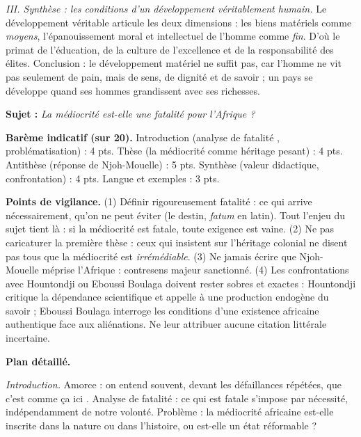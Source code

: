\documentclass[11pt]{article}
\begin{document}
\begin{corrige}
\emph{III. Synthèse : les conditions d'un développement véritablement humain.} Le développement véritable articule les deux dimensions : les biens matériels comme \emph{moyens}, l'épanouissement moral et intellectuel de l'homme comme \emph{fin}. D'où le primat de l'éducation, de la culture de l'excellence et de la responsabilité des élites. Conclusion : le développement matériel ne suffit pas, car l'homme ne vit pas seulement de pain, mais de sens, de dignité et de savoir ; un pays se développe quand ses hommes grandissent avec ses richesses.
\end{corrige}

\begin{corrige}

\textbf{Sujet :} \emph{La médiocrité est-elle une fatalité pour l'Afrique ?}

\tcblower

\textbf{Barème indicatif (sur 20).} Introduction (analyse de \guillemotleft fatalité \guillemotright, problématisation) : 4 pts. Thèse (la médiocrité comme héritage pesant) : 4 pts. Antithèse (réponse de Njoh-Mouelle) : 5 pts. Synthèse (valeur didactique, confrontation) : 4 pts. Langue et exemples : 3 pts.

\textbf{Points de vigilance.} (1) Définir rigoureusement \guillemotleft fatalité \guillemotright : ce qui arrive nécessairement, qu'on ne peut éviter (le destin, \emph{fatum} en latin). Tout l'enjeu du sujet tient là : si la médiocrité est fatale, toute exigence est vaine. (2) Ne pas caricaturer la première thèse : ceux qui insistent sur l'héritage colonial ne disent pas tous que la médiocrité est \emph{irrémédiable}. (3) Ne jamais écrire que Njoh-Mouelle \guillemotleft méprise l'Afrique \guillemotright : contresens majeur sanctionné. (4) Les confrontations avec Hountondji ou Eboussi Boulaga doivent rester sobres et exactes : Hountondji critique la dépendance scientifique et appelle à une production endogène du savoir ; Eboussi Boulaga interroge les conditions d'une existence africaine authentique face aux aliénations. Ne leur attribuer aucune citation littérale incertaine.

\textbf{Plan détaillé.}

\emph{Introduction.} Amorce : on entend souvent, devant les défaillances répétées, que \guillemotleft c'est comme ça ici \guillemotright. Analyse de \guillemotleft fatalité \guillemotright : ce qui est fatale s'impose par nécessité, indépendamment de notre volonté. Problème : la médiocrité africaine est-elle inscrite dans la nature ou dans l'histoire, ou est-elle un état réformable ?


\end{corrige}
\end{document}
